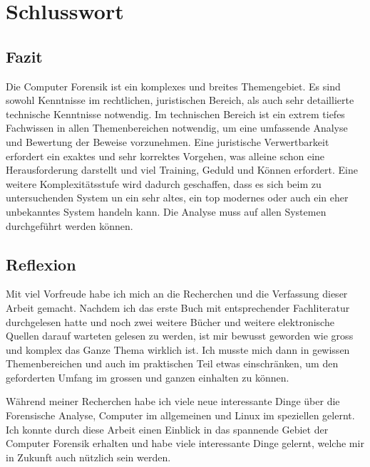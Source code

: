 \chapter{Schlusswort}

\section{Fazit}
Die Computer Forensik ist ein komplexes und breites Themengebiet. Es sind sowohl Kenntnisse im rechtlichen, juristischen Bereich, als auch sehr detaillierte technische Kenntnisse notwendig. Im technischen Bereich ist ein extrem tiefes Fachwissen in allen Themenbereichen notwendig, um eine umfassende Analyse und Bewertung der Beweise vorzunehmen. Eine juristische Verwertbarkeit erfordert ein exaktes und sehr korrektes Vorgehen, was alleine schon eine Herausforderung darstellt und viel Training, Geduld und Können erfordert. Eine weitere Komplexitätsstufe wird dadurch geschaffen, dass es sich beim zu untersuchenden System un ein sehr altes, ein top modernes oder auch ein eher unbekanntes System handeln kann. Die Analyse muss auf allen Systemen durchgeführt werden können.

\section{Reflexion}
Mit viel Vorfreude habe ich mich an die Recherchen und die Verfassung dieser Arbeit gemacht. Nachdem ich das erste Buch mit entsprechender Fachliteratur durchgelesen hatte und noch zwei weitere Bücher und weitere elektronische Quellen darauf warteten gelesen zu werden, ist mir bewusst geworden wie gross und komplex das Ganze Thema wirklich ist. Ich musste mich dann in gewissen Themenbereichen und auch im praktischen Teil etwas einschränken, um den geforderten Umfang im grossen und ganzen einhalten zu können.

Während meiner Recherchen habe ich viele neue interessante Dinge über die Forensische Analyse, Computer im allgemeinen und Linux im speziellen gelernt. Ich konnte durch diese Arbeit einen Einblick in das spannende Gebiet der Computer Forensik erhalten und habe viele interessante Dinge gelernt, welche mir in Zukunft auch nützlich sein werden.